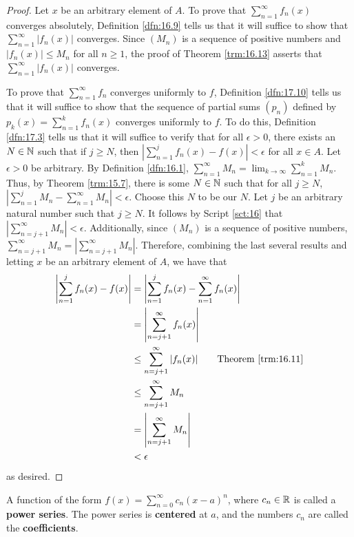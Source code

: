 \documentclass[../main.tex]{subfiles}
\begin{document}
\begin{theorem}
\begin{proof}
        Let $x$ be an arbitrary element of $A$. To prove that $\sum_{n=1}^\infty f_n(x)$ converges absolutely, Definition \ref{dfn:16.9} tells us that it will suffice to show that $\sum_{n=1}^\infty|f_n(x)|$ converges. Since $(M_n)$ is a sequence of positive numbers and $|f_n(x)|\leq M_n$ for all $n\geq 1$, the proof of Theorem \ref{trm:16.13} asserts that $\sum_{n=1}^\infty|f_n(x)|$ converges.\par
        To prove that $\sum_{n=1}^\infty f_n$ converges uniformly to $f$, Definition \ref{dfn:17.10} tells us that it will suffice to show that the sequence of partial sums $(p_n)$ defined by $p_k(x)=\sum_{n=1}^kf_n(x)$ converges uniformly to $f$. To do this, Definition \ref{dfn:17.3} tells us that it will suffice to verify that for all $\epsilon>0$, there exists an $N\in\mathbb{N}$ such that if $j\geq N$, then $|\sum_{n=1}^jf_n(x)-f(x)|<\epsilon$ for all $x\in A$. Let $\epsilon>0$ be arbitrary. By Definition \ref{dfn:16.1}, $\sum_{n=1}^\infty M_n=\lim_{k\to\infty}\sum_{n=1}^kM_n$. Thus, by Theorem \ref{trm:15.7}, there is some $N\in\mathbb{N}$ such that for all $j\geq N$, $|\sum_{n=1}^jM_n-\sum_{n=1}^\infty M_n|<\epsilon$. Choose this $N$ to be our $N$. Let $j$ be an arbitrary natural number such that $j\geq N$. It follows by Script \ref{sct:16} that $|\sum_{n=j+1}^\infty M_n|<\epsilon$. Additionally, since $(M_n)$ is a sequence of positive numbers, $\sum_{n=j+1}^\infty M_n=|\sum_{n=j+1}^\infty M_n|$. Therefore, combining the last several results and letting $x$ be an arbitrary element of $A$, we have that
        \begin{align*}
            \left| \sum_{n=1}^jf_n(x)-f(x) \right| &= \left| \sum_{n=1}^jf_n(x)-\sum_{n=1}^\infty f_n(x) \right|\\
            &= \left| \sum_{n=j+1}^\infty f_n(x) \right|\\
            &\leq \sum_{n=j+1}^\infty|f_n(x)|\tag*{Theorem \ref{trm:16.11}}\\
            &\leq \sum_{n=j+1}^\infty M_n\\
            &= \left| \sum_{n=j+1}^\infty M_n \right|\\
            &< \epsilon
        \end{align*}
        as desired.
    \end{proof}
\end{theorem}

\begin{definition}\label{dfn:17.12}
    A function of the form $f(x)=\sum_{n=0}^\infty c_n(x-a)^n$, where $c_n\in\mathbb{R}$ is called a \textbf{power series}. The power series is \textbf{centered} at $a$, and the numbers $c_n$ are called the \textbf{coefficients}.
\end{definition}
\end{document}
